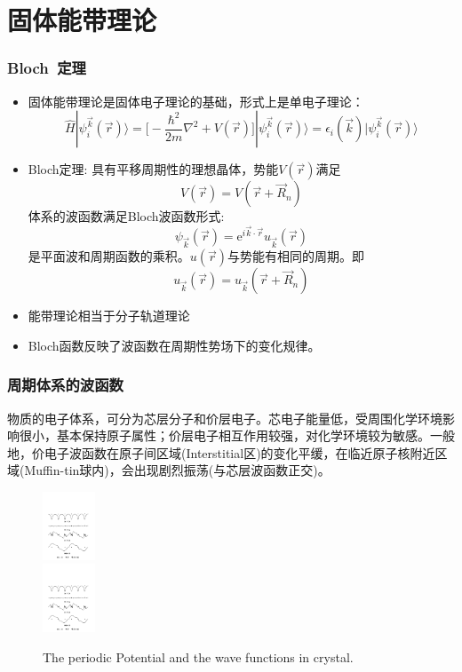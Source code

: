 \section{固体能带理论}       %
\frame
{
	\frametitle{\textrm{Bloch~}定理}
\begin{itemize}%
   \setlength{\itemsep}{8pt}
   \item 固体能带理论是固体电子理论的基础，形式上是单电子理论：
    $$\hat H |\psi_i^{\vec k}(\vec r)\rangle=\bigg[-\dfrac{\hbar^2}{2m}\nabla^2+V(\vec r)\bigg]|\psi_i^{\vec k}(\vec r)\rangle=\epsilon_i(\vec k)|\psi_i^{\vec k}(\vec r)\rangle$$
  \item \textrm{Bloch}定理:
具有平移周期性的理想晶体，势能$V(\vec r)$满足$$V(\vec r)=V(\vec r+\vec R_n)$$
体系的波函数满足\textrm{Bloch}波函数形式:$$\psi_{\vec k}(\vec r)=\textrm{e}^{i\vec k\cdot\vec r}u_{\vec k}(\vec r)$$
是平面波和周期函数的乘积。$u(\vec r)$与势能有相同的周期。即$$u_{\vec k}(\vec r)=u_{\vec k}(\vec r+\vec R_n)$$
  \item 能带理论相当于分子轨道理论
\item \textrm{Bloch}函数反映了波函数在周期性势场下的变化规律。
\end{itemize}
}

\frame
{
\frametitle{周期体系的波函数}
物质的电子体系，可分为芯层分子和价层电子。芯电子能量低，受周围化学环境影响很小，基本保持原子属性；价层电子相互作用较强，对化学环境较为敏感。一般地，价电子波函数在原子间区域(\textrm{Interstitial}区)的变化平缓，在临近原子核附近区域(\textrm{Muffin-tin}球内)，会出现剧烈振荡(与芯层波函数正交)。
\begin{figure}[h!]
\centering
\includegraphics[height=0.8in,width=4.in,viewport=41 433 539 546,clip]{Figures/Pseudo_wave.pdf}\\
\includegraphics[height=0.8in,width=4.in,viewport=41 210 539 339,clip]{Figures/Pseudo_wave.pdf}
\caption{\tiny \textrm{The periodic Potential and the wave functions in crystal.}}%
\label{Potential-Wave}
\end{figure}
}

